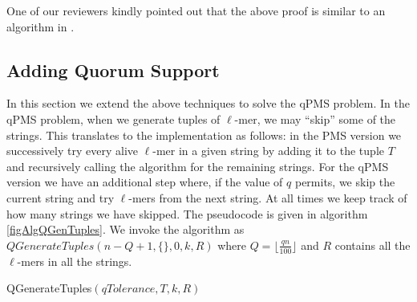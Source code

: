 One of our reviewers kindly pointed out that the above proof is similar to an
algorithm in \cite{GNR01}.

\subsection{Adding Quorum Support}
In this section we extend the above techniques to solve the qPMS
problem. In the qPMS problem, when we generate tuples of $\ell$-mer, we may
``skip'' some of the strings.
This translates to the implementation as follows: in the PMS version we
successively try every alive $\ell$-mer in a given string by adding it to
the tuple $T$ and recursively calling the algorithm for the remaining strings.
For the qPMS version we have an additional step where, if the value of $q$
permits, we skip the current string and try $\ell$-mers
from the next string. At all times we keep track of how many strings we have
skipped. The pseudocode is given in algorithm \ref{figAlgQGenTuples}.
We invoke the algorithm as $QGenerateTuples(n-Q+1, \{\}, 0, k, R)$
where $Q=\lfloor\frac{qn}{100}\rfloor$ and $R$ contains all the $\ell$-mers in
all the strings.


\begin{algorithm}

\caption{QGenerateTuples$(qTolerance,T,k,R)$} \label{figAlgQGenTuples}


\end{algorithm}


